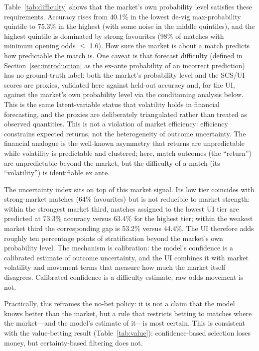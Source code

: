 Table~\ref{tab:difficulty} shows that the market's own probability
level satisfies these requirements. Accuracy rises from 40.1\% in
the lowest de-vig max-probability quintile to 75.3\% in the highest
(with some noise in the middle quintiles), and the highest quintile
is dominated by strong favourites (98\% of matches with minimum
opening odds $\leq$ 1.6). How sure the market is about a match
predicts how predictable the match is. One caveat is that forecast
difficulty (defined in Section~\ref{sec:introduction} as the
ex-ante probability of an incorrect prediction) has no ground-truth
label: both the market's probability level and the SCS/UI scores are
proxies, validated here against held-out accuracy and, for the UI,
against the market's own probability level via the conditioning
analysis below. This is the
same latent-variable status that volatility holds in financial
forecasting, and the proxies are deliberately triangulated rather
than treated as observed quantities. This is not a violation of
market efficiency: efficiency constrains expected returns, not the
heterogeneity of outcome uncertainty. The financial analogue is the
well-known asymmetry that returns are unpredictable while volatility
is predictable and clustered; here, match outcomes (the ``return'')
are unpredictable beyond the market, but the difficulty of a match
(its ``volatility'') is identifiable ex ante.

The uncertainty index sits on top of this market signal. Its low
tier coincides with strong-market matches (64\% favourites) but is
not reducible to market strength: within the strongest market third,
matches assigned to the lowest UI tier are predicted at 73.3\%
accuracy versus 63.4\% for the highest tier; within the weakest
market third the corresponding gap is 53.2\% versus 44.4\%. The UI
therefore adds roughly ten percentage points of stratification beyond
the market's own probability level. The mechanism is calibration:
the model's confidence is a calibrated estimate of outcome
uncertainty, and the UI combines it with market volatility and
movement terms that measure how much the market itself disagrees.
Calibrated confidence is a difficulty estimate; raw odds movement is
not.

Practically, this reframes the no-bet policy: it is not a claim that
the model knows better than the market, but a rule that restricts
betting to matches where the market---and the model's estimate of
it---is most certain. This is consistent with the value-betting
result (Table~\ref{tab:value}): confidence-based selection loses
money, but certainty-based filtering does not.

